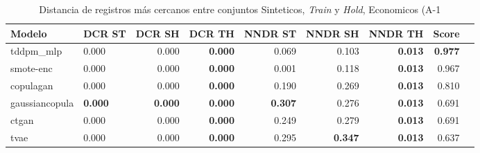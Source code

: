 \begin{table}[H]
\centering
\caption{Distancia de registros más cercanos entre conjuntos Sinteticos, \emph{Train} y \emph{Hold}, Economicos (A-1}
\label{table-dcr-economicos-a-1}
\begin{tabular}{|l|l|r|r|r|r|r|r|r|}
\hline
\rowcolor[gray]{0.8}
Modelo & DCR ST & DCR SH & DCR TH & NNDR ST & NNDR SH & NNDR TH & \textbf{Score} \\
\hline tddpm\_mlp & 0.000 & \cellcolor[rgb]{0.9, 0.54, 0.52} 0.000 & \bfseries 0.000 & 0.069 & 0.103 & \bfseries 0.013 & \bfseries 0.977 \\
\hline smote-enc & \cellcolor[rgb]{0.9, 0.54, 0.52} 0.000 & 0.000 & \bfseries 0.000 & 0.001 & 0.118 & \bfseries 0.013 & 0.967 \\
\hline copulagan & 0.000 & 0.000 & \bfseries 0.000 & 0.190 & 0.269 & \bfseries 0.013 & 0.810 \\
\hline gaussiancopula & \bfseries 0.000 & \bfseries 0.000 & \bfseries 0.000 & \bfseries 0.307 & 0.276 & \bfseries 0.013 & 0.691 \\
\hline ctgan & 0.000 & 0.000 & \bfseries 0.000 & 0.249 & 0.279 & \bfseries 0.013 & 0.691 \\
\hline tvae & 0.000 & 0.000 & \bfseries 0.000 & 0.295 & \bfseries 0.347 & \bfseries 0.013 & 0.637 \\
\hline
\end{tabular}
\end{table}
